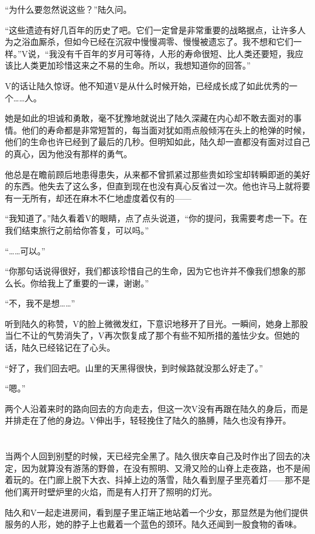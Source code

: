 “为什么要忽然说这些？”陆久问。

“这些遗迹有好几百年的历史了吧。它们一定曾是非常重要的战略据点，让许多人为之浴血厮杀，但如今已经在沉寂中慢慢凋零、慢慢被遗忘了。我不想和它们一样。”V说，“我没有千百年的岁月可等待，人形的寿命很短、比人类还要短，我应该比人类更加珍惜这来之不易的生命。所以，我想知道你的回答。”

V的话让陆久惊讶。他不知道V是从什么时候开始，已经成长成了如此优秀的一个……人。

她是如此的坦诚和勇敢，毫不犹豫地就说出了陆久深藏在内心却不敢去面对的事情。他们的寿命都是非常短暂的，每当面对犹如雨点般倾泻在头上的枪弹的时候，他们的生命也许已经到了最后的几秒。但明知如此，陆久却一直都没有面对过自己的真心，因为他没有那样的勇气。

他总是在瞻前顾后地患得患失，从来都不曾抓紧过那些贵如珍宝却转瞬即逝的美好的东西。他失去了这么多，但直到现在也没有真心反省过一次。他也许马上就将要有一无所有，却还在麻木不仁地虚度着仅有的——

“我知道了。”陆久看着V的眼睛，点了点头说道，“你的提问，我需要考虑一下。在我们结束旅行之前给你答复，可以吗。”

“……可以。”

“你那句话说得很好，我们都该珍惜自己的生命，因为它也许并不像我们想象的那么长。你给我上了重要的一课，谢谢。”

“不，我不是想……”

听到陆久的称赞，V的脸上微微发红，下意识地移开了目光。一瞬间，她身上那股当仁不让的气势消失了，V再次恢复成了那个有些不知所措的羞怯少女。但她的话，陆久已经铭记在了心头。

“好了，我们回去吧。山里的天黑得很快，到时候路就没那么好走了。”

“嗯。”

两个人沿着来时的路向回去的方向走去，但这一次V没有再跟在陆久的身后，而是并排走在了他的身边。V伸出手，轻轻挽住了陆久的胳膊，陆久也没有挣开。

\section*{}

当两个人回到别墅的时候，天已经完全黑了。陆久很庆幸自己及时作出了回去的决定，因为就算没有游荡的野兽，在没有照明、又滑又险的山脊上走夜路，也不是闹着玩的。在门廊上脱下大衣、抖掉上边的落雪，陆久看到屋子里亮着灯——那不是他们离开时壁炉里的火焰，而是有人打开了照明的灯光。

陆久和V一起走进房间，看到屋子里正端正地站着一个少女，那显然是为他们提供服务的人形，她的脖子上也戴着一个蓝色的颈环。陆久还闻到一股食物的香味。 

